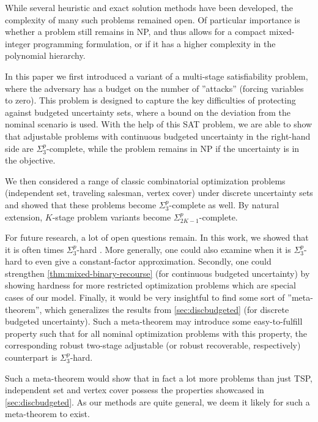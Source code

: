 \documentclass[a4paper,abstracton]{scrartcl}
\begin{document}
While several heuristic and exact solution methods have been developed, the complexity of many such problems remained open. Of particular importance is whether a problem still remains in NP, and thus allows for a compact mixed-integer programming formulation, or if it has a higher complexity in the polynomial hierarchy. 

In this paper we first introduced a variant of a multi-stage satisfiability problem, where the adversary has a budget on the number of ''attacks'' (forcing variables to zero). This problem is designed to capture the key difficulties of protecting against budgeted uncertainty sets, where a bound on the deviation from the nominal scenario is used. With the help of this SAT problem, we are able to show that adjustable problems with continuous budgeted uncertainty in the right-hand side are $\Sigma^p_3$-complete, while the problem remains in NP if the uncertainty is in the objective.

We then considered a range of classic combinatorial optimization problems (independent set, traveling salesman, vertex cover) under discrete uncertainty sets and showed that these problems become $\Sigma^p_3$-complete as well. By natural extension, $K$-stage problem variants become $\Sigma^p_{2K-1}$-complete.

For future research, a lot of open questions remain. In this work, we showed that it is often times $\Sigma^p_3$-hard . More generally, one could also examine when it is $\Sigma^p_3$-hard to even give a constant-factor approximation.
Secondly, one could strengthen \cref{thm:mixed-binary-recourse} (for continuous budgeted uncertainty) by showing hardness for more restricted optimization problems which are special cases of our model.
Finally, it would be very insightful to find some sort of ''meta-theorem'', which generalizes the results from \cref{sec:discbudgeted} (for discrete budgeted uncertainty). 
Such a meta-theorem may introduce some easy-to-fulfill property such that for all nominal optimization problems with this property, the corresponding robust two-stage adjustable (or robust recoverable, respectively)  counterpart is $\Sigma^p_3$-hard. 

Such a meta-theorem would show that in fact a lot more problems than just TSP, independent set and vertex cover possess the properties showcased in \cref{sec:discbudgeted}. As our methods are quite general, we deem it likely for such a meta-theorem to exist. 


 

\end{document}
